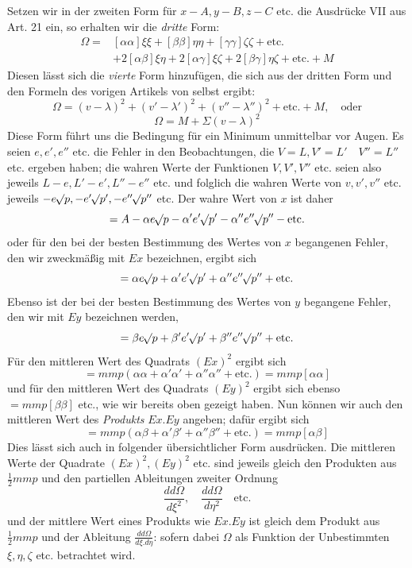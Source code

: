 Setzen wir in der zweiten Form für \(x-A,y-B,z-C\) etc. die Ausdrücke VII aus Art. 21 ein, so erhalten wir die \textit{dritte} Form:
\[
\begin{aligned}
\Omega={}&[\alpha\alpha]\xi\xi+[\beta\beta]\eta\eta+[\gamma\gamma]\zeta\zeta+\text{etc.}\\
&+2[\alpha\beta]\xi\eta+2[\alpha\gamma]\xi\zeta+2[\beta\gamma]\eta\zeta+\text{etc.}+M
\end{aligned}
\]
Diesen lässt sich die \textit{vierte} Form hinzufügen, die sich aus der dritten Form und den Formeln des vorigen Artikels von selbst ergibt:
\[
\Omega=(v-\lambda)^2+(v'-\lambda')^2+(v''-\lambda'')^2+\text{etc.}+M,\quad\text{oder}
\]
\[
\Omega=M+\Sigma(v-\lambda)^2
\]
Diese Form führt uns die Bedingung für ein Minimum unmittelbar vor Augen.
Es seien \(e,e',e''\) etc. die Fehler in den Beobachtungen, die \(V=L,\allowbreak V'=L'\quad V''=L''\) etc. ergeben haben; die wahren Werte der Funktionen \(V,V',V''\) etc. seien also jeweils \(L-e,L'-e',L''-e''\) etc. und folglich die wahren Werte von \(v,v',v''\) etc. jeweils \(-e\mathord{{}^{}\!\surd}p,\allowbreak-e'\mathord{{}^{}\!\surd}p',\allowbreak-e''\mathord{{}^{}\!\surd}p''\) etc. Der wahre Wert von \(x\) ist daher
\[
=A-\alpha e\mathord{{}^{}\!\surd}p-\alpha'e'\mathord{{}^{}\!\surd}p'-\alpha''e''\mathord{{}^{}\!\surd}p''-\text{etc.}
\]
oder für den bei der besten Bestimmung des Wertes von \(x\) begangenen Fehler, den wir zweckmäßig mit \(Ex\) bezeichnen, ergibt sich
\[
=\alpha e\mathord{{}^{}\!\surd}p+\alpha'e'\mathord{{}^{}\!\surd}p'+\alpha''e''\mathord{{}^{}\!\surd}p''+\text{etc.}
\]
Ebenso ist der bei der besten Bestimmung des Wertes von \(y\) begangene Fehler, den wir mit \(Ey\) bezeichnen werden,
\[
=\beta e\mathord{{}^{}\!\surd}p+\beta'e'\mathord{{}^{}\!\surd}p'+\beta''e''\mathord{{}^{}\!\surd}p''+\text{etc.}
\]
Für den mittleren Wert des Quadrats \((Ex)^2\) ergibt sich
\[
=mmp(\alpha\alpha+\alpha'\alpha'+\alpha''\alpha''+\text{etc.})=mmp[\alpha\alpha]
\]
und für den mittleren Wert des Quadrats \((Ey)^2\) ergibt sich ebenso \(=mmp[\beta\beta]\) etc., wie wir bereits oben gezeigt haben. Nun können wir auch den mittleren Wert des \textit{Produkts} \(Ex.Ey\) angeben; dafür ergibt sich
\[
=mmp(\alpha\beta+\alpha'\beta'+\alpha''\beta''+\text{etc.})=mmp[\alpha\beta]
\]
Dies lässt sich auch in folgender übersichtlicher Form ausdrücken. Die mittleren Werte der Quadrate \((Ex)^2,(Ey)^2\) etc. sind jeweils gleich den Produkten aus \(\frac12mmp\) und den partiellen Ableitungen zweiter Ordnung
\[
\frac{dd\Omega}{d\xi^2},\quad\frac{dd\Omega}{d\eta^2}\quad\text{etc.}
\]
und der mittlere Wert eines Produkts wie \(Ex.Ey\) ist gleich dem Produkt aus \(\frac12mmp\) und der Ableitung \(\frac{dd\Omega}{d\xi.d\eta}\): sofern dabei \(\Omega\) als Funktion der Unbestimmten \(\xi,\eta,\zeta\) etc. betrachtet wird.
\clearpage
